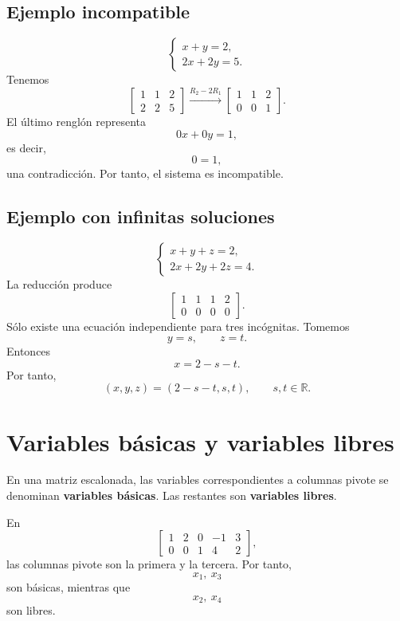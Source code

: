 \documentclass[12pt]{article}
\theoremstyle{remark}
\newcommand{\R}{\mathbb{R}}
\begin{document}
\subsection{Ejemplo incompatible}

\[
\begin{cases}
x+y=2,\\
2x+2y=5.
\end{cases}
\]
Tenemos
\[
\left[
\begin{array}{cc|c}
1&1&2\\
2&2&5
\end{array}
\right]
\xrightarrow{R_2-2R_1}
\left[
\begin{array}{cc|c}
1&1&2\\
0&0&1
\end{array}
\right].
\]
El último renglón representa
\[
0x+0y=1,
\]
es decir,
\[
0=1,
\]
una contradicción. Por tanto, el sistema es incompatible.

\subsection{Ejemplo con infinitas soluciones}

\[
\begin{cases}
x+y+z=2,\\
2x+2y+2z=4.
\end{cases}
\]
La reducción produce
\[
\left[
\begin{array}{ccc|c}
1&1&1&2\\
0&0&0&0
\end{array}
\right].
\]
Sólo existe una ecuación independiente para tres incógnitas. Tomemos
\[
y=s,\qquad z=t.
\]
Entonces
\[
x=2-s-t.
\]
Por tanto,
\[
\boxed{(x,y,z)=(2-s-t,s,t),\qquad s,t\in\R.}
\]

\section{Variables básicas y variables libres}

En una matriz escalonada, las variables correspondientes a columnas pivote se denominan
\textbf{variables básicas}. Las restantes son \textbf{variables libres}.

En
\[
\left[
\begin{array}{cccc|c}
1&2&0&-1&3\\
0&0&1&4&2
\end{array}
\right],
\]
las columnas pivote son la primera y la tercera. Por tanto,
\[
x_1,\ x_3
\]
son básicas, mientras que
\[
x_2,\ x_4
\]
son libres.
\end{document}
